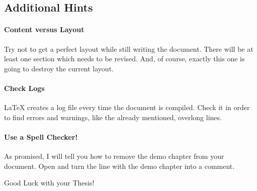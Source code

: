 \subsection{Additional Hints}
%
\paragraph{Content versus Layout}
%
Try not to get a perfect layout while still writing the document. 
There will be at least one section which needs to be revised. 
And, of course, exactly this one is going to destroy the current layout. 
%
\paragraph{Check Logs}
%
{\LaTeX} creates a log file every time the document is compiled. 
Check it in order to find errors and warnings, like the already mentioned, 
overlong lines.
%
\paragraph{Use a Spell Checker!}
%
\par
%
As promised, I will tell you how to remove the demo chapter from your
document.
Open  and turn the line with the demo chapter into a comment.
%
\par{Good Luck with your Thesis!}
